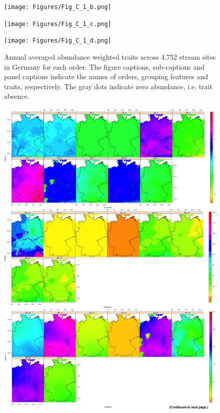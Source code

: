 \newpage

\begin{figure}[hp!]
  \centering
  \texttt{[image: Figures/Fig\_C\_1\_b.png]}
  \label{Fig_C_1_b}
\end{figure}

\newpage

\begin{figure}[hp!]
  \centering
  \hspace{-2cm}\texttt{[image: Figures/Fig\_C\_1\_c.png]}
  \label{Fig_C_1_c}
\end{figure}

\newpage

\begin{figure}[hp!]
  \centering
  \texttt{[image: Figures/Fig\_C\_1\_d.png]}
  \caption{Annual averaged abundance weighted traits across 4,752 stream sites in Germany for each order. The figure captions, sub-captions and panel captions indicate the names of orders, grouping features and traits, respectively. The gray dots indicate zero abundance, i.e. trait absence.}
  \label{Fig_C_1_d}
\end{figure}

\newpage

\begin{figure}[hp!]
  \centering
  \hspace{-2cm}\includegraphics[width=1.1\textwidth]{Figures/Fig_C_2_a.png}
  \label{Fig_C_2_a}
\end{figure}

